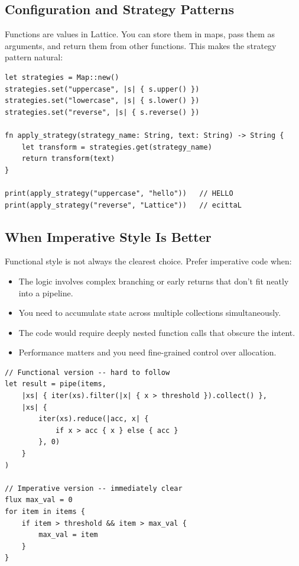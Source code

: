 \subsection{Configuration and Strategy Patterns}\label{subsec:when-strategy}

Functions are values in Lattice.
You can store them in maps, pass them as arguments, and return them from other functions.
This makes the strategy pattern natural:

\begin{lstlisting}[language=Lattice, caption={Strategy pattern with functions}]
let strategies = Map::new()
strategies.set("uppercase", |s| { s.upper() })
strategies.set("lowercase", |s| { s.lower() })
strategies.set("reverse", |s| { s.reverse() })

fn apply_strategy(strategy_name: String, text: String) -> String {
    let transform = strategies.get(strategy_name)
    return transform(text)
}

print(apply_strategy("uppercase", "hello"))   // HELLO
print(apply_strategy("reverse", "Lattice"))   // ecittaL
\end{lstlisting}

\subsection{When Imperative Style Is Better}\label{subsec:when-imperative}

Functional style is not always the clearest choice.
Prefer imperative code when:

\begin{itemize}[nosep]
  \item The logic involves complex branching or early returns that don't fit neatly into a pipeline.
  \item You need to accumulate state across multiple collections simultaneously.
  \item The code would require deeply nested function calls that obscure the intent.
  \item Performance matters and you need fine-grained control over allocation.
\end{itemize}

\begin{lstlisting}[language=Lattice, caption={Sometimes a loop is clearer}]
// Functional version -- hard to follow
let result = pipe(items,
    |xs| { iter(xs).filter(|x| { x > threshold }).collect() },
    |xs| {
        iter(xs).reduce(|acc, x| {
            if x > acc { x } else { acc }
        }, 0)
    }
)

// Imperative version -- immediately clear
flux max_val = 0
for item in items {
    if item > threshold && item > max_val {
        max_val = item
    }
}
\end{lstlisting}

